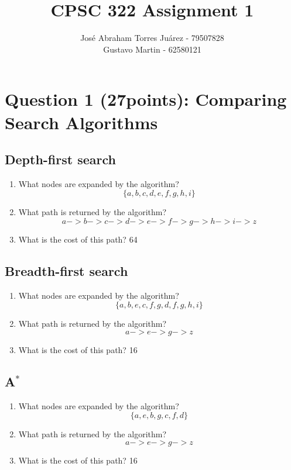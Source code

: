 \documentclass{article}
\def\ans#1{{\color{ans}#1}}
\newcommand{\centerfig}[2]{\begin{center}\texttt{[image: \#2]}\end{center}}
\begin{document}
\title{CPSC 322 Assignment 1}
\author{
    José Abraham Torres Juárez - 79507828 \\
    Gustavo Martin - 62580121
}
\date{}
\maketitle
\vspace{-2em}


\section{Question 1 (27points): Comparing Search Algorithms}

\subsection{Depth-first search}
\begin{enumerate}[label=(\alph*)]
    \item What nodes are expanded by the algorithm?
    \ans{
        \[\{a, b, c, d, e, f, g, h, i\}\]
    }
    \item What path is returned by the algorithm?
    \ans{
        \[a->b->c->d->e->f->g->h->i->z\]
    }
    \item What is the cost of this path?
    \ans{
        64
    }
\end{enumerate}

\subsection{Breadth-first search}
\begin{enumerate}[label=(\alph*)]
    \item What nodes are expanded by the algorithm?
    \ans{
        \[\{a, b, e, c, f, g, d, f, g, h, i\}\]
    }
    \item What path is returned by the algorithm?
    \ans{
        \[a->e->g->z\]
    }
    \item What is the cost of this path?
    \ans{
        16
    }
\end{enumerate}

\subsection{A$^*$}
\begin{enumerate}[label=(\alph*)]
    \item What nodes are expanded by the algorithm?
    \ans{
        \[\{a, e, b, g, c, f, d\}\]
    }
    \item What path is returned by the algorithm?
    \ans{
        \[a->e->g->z\]
    }
    \item What is the cost of this path?
    \ans{
        16
    }
\end{enumerate}
\end{document}
